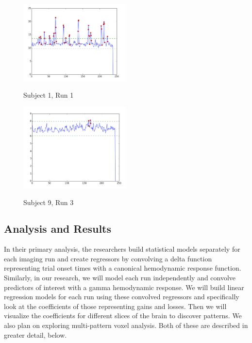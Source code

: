 \documentclass[11pt]{article}
\begin{document}
\begin{figure}[h]
\caption{Subject 1, Run 1}
\centering
\includegraphics[width=0.5\textwidth]{outliers-1-1.png}
\label{fig:outliers-1-1}
\end{figure}

\begin{figure}[h]
\caption{Subject 9, Run 3}
\centering
\includegraphics[width=0.5\textwidth]{outliers-9-3.png}
\label{fig:outliers-9-3}
\end{figure}

\subsection{Analysis and Results}

In their primary analysis, the researchers build statistical models separately
for each imaging run and create regressors by convolving a delta function
representing trial onset times with a canonical hemodynamic response function.
Similarly, in our research, we will model each run independently and convolve
predictors of interest with a gamma hemodynamic response. We will build linear
regression models for each run using these convolved regressors and
specifically look at the coefficients of those representing gains and losses.
Then we will visualize the coefficients for different slices of the brain to
discover patterns. We also plan on exploring multi-pattern voxel analysis. Both
of these are described in greater detail, below.
\end{document}
